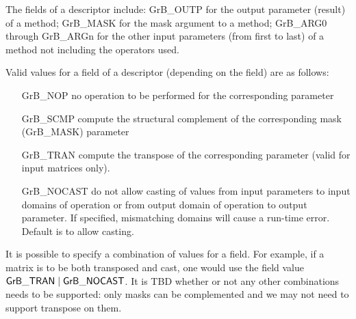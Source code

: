 The fields of a descriptor include: {\sf GrB\_OUTP} for the output parameter 
(result) of a method; {\sf GrB\_MASK} for the mask argument to a method; 
{\sf GrB\_ARG0} through {\sf GrB\_ARGn} for the other input parameters 
(from first to last) of a method not including the operators used.


Valid values for a field of a descriptor (depending on the field) are as follows:

\begin{itemize}[leftmargin=1.5in]
\item[{\sf GrB\_NOP}]    no operation to be performed for the corresponding parameter
\item[{\sf GrB\_SCMP}]   compute the structural complement of the corresponding mask
                         (GrB\_MASK) parameter
\item[{\sf GrB\_TRAN}]   compute the transpose of the corresponding parameter (valid
                         for input matrices only).
\item[{\sf GrB\_NOCAST}] do not allow casting of values from input parameters to input domains 
                         of operation or from output domain of operation to output 
                         parameter. If specified, mismatching domains will cause a 
                         run-time error. Default is to allow casting.
\end{itemize}

It is possible to specify a combination of values for a field. For 
example, if a matrix is to be both transposed and cast, one would use the field value
${\sf GrB\_TRAN} \mid {\sf GrB\_NOCAST}$.  It is TBD whether or not any other combinations
needs to be supported: only masks can be complemented and we may not need to support
transpose on them.

